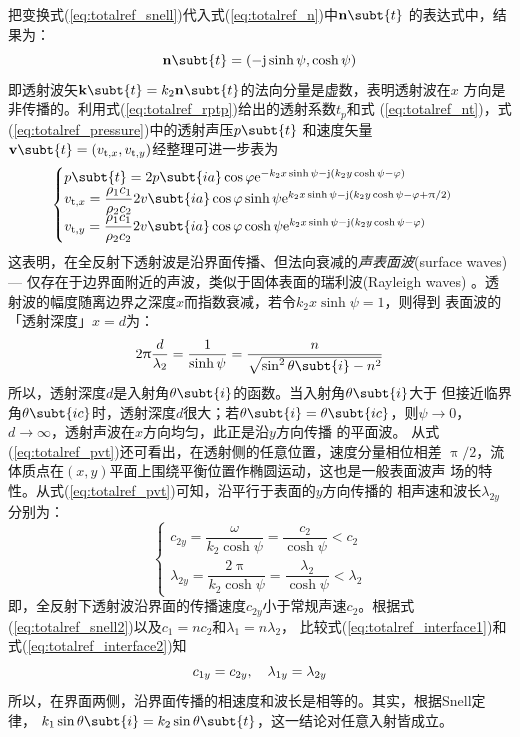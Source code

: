 \documentclass[UTF8]{ctexbook}
\begin{document}
把变换式(\ref{eq:totalref_snell})代入式(\ref{eq:totalref_n})中$\vb{n}\subt{t}$
的表达式中，结果为：
\begin{equation}
\vb{n}\subt{t} = (-\mj \sinh \psi, \cosh\psi)
\label{eq:totalref_nt}
\end{equation}
即透射波矢$\vb{k}\subt{t} = k_2\vb{n}\subt{t}$的法向分量是虚数，表明透射波在$x$
方向是非传播的。利用式(\ref{eq:totalref_rptp})给出的透射系数$t_p$和式
(\ref{eq:totalref_nt})，式(\ref{eq:totalref_pressure})中的透射声压$p\subt{t}$
和速度矢量$\vb{v}\subt{t}=(v_{\mathrm{t,} x}, v_{\mathrm{t,} y})$经整理可进一步表为
\begin{equation}
	\label{eq:totalref_pvt}
	\begin{cases}
		p\subt{t} = 2p\subt{ia} \cos \phi \me^{-k_2x\sinh \psi - \mj (k_2 y
		\cosh \psi -\phi)}\\
		v_{\mathrm{t,}x} = \dfrac{\rho_1c_1}{\rho_2c_2} 2v\subt{ia} \cos\phi
		\sinh \psi \me^{k_2x\sinh \psi - \mj\qty(k_2y\cosh \psi -\phi
		+\uppi/2)}\\
		v_{\mathrm{t,}y} = \dfrac{\rho_1c_1}{\rho_2c_2} 2v\subt{ia} \cos\phi
		\cosh \psi \me^{k_2x\sinh \psi - \mj\qty(k_2y\cosh \psi -\phi
		)}
	\end{cases}
\end{equation}
这表明，在全反射下透射波是沿界面传播、但法向衰减的\emph{声表面波}(surface
waves) --- 仅存在于边界面附近的声波，类似于固体表面的瑞利波(Rayleigh waves)
。透射波的幅度随离边界之深度$x$而指数衰减，若令$k_2x\sinh \psi = 1$，则得到
表面波的「透射深度」$x=d$为：
\begin{equation}
	2\uppi \frac{d}{\lambda_2} = \frac{1}{\sinh\psi} = \frac{n}{\sqrt{
		\sin^2\theta\subt{i}-n^2}}
\end{equation}
所以，透射深度$d$是入射角$\theta\subt{i}$的函数。当入射角$\theta\subt{i}$大于
但接近临界角$\theta\subt{ic}$时，透射深度$d$很大；若$\theta\subt{i}=\theta\subt{ic}
$，则$\psi\to0$，$d \to \infty$，透射声波在$x$方向均匀，此正是沿$y$方向传播
的平面波。
从式(\ref{eq:totalref_pvt})还可看出，在透射侧的任意位置，速度分量相位相差
$\uppi/2$，流体质点在$(x,y)$平面上围绕平衡位置作椭圆运动，这也是一般表面波声
场的特性。从式(\ref{eq:totalref_pvt})可知，沿平行于表面的$y$方向传播的
相声速和波长$\lambda_{2y}$分别为：
\begin{equation}
	\label{eq:totalref_interface2}
	\begin{cases}
		c_{2y} = \dfrac{\omega}{k_2\cosh\psi} = \dfrac{c_2}{\cosh\psi}<c_2\\
		\lambda_{2y} = \dfrac{2\uppi}{k_2\cosh \psi} = \dfrac{
		\lambda_2}{\cosh \psi} <\lambda_2
	\end{cases}
\end{equation}
即，全反射下透射波沿界面的传播速度$c_{2y}$小于常规声速$c_2$。根据式
(\ref{eq:totalref_snell2})以及$c_1=nc_2$和$\lambda_1 = n\lambda_2$，
比较式(\ref{eq:totalref_interface1})和式(\ref{eq:totalref_interface2})知
$$
c_{1y} = c_{2y} \qc \lambda_{1y}=\lambda_{2y}
$$
所以，在界面两侧，沿界面传播的相速度和波长是相等的。其实，根据Snell定律，
$k_1\sin\theta\subt{i} = k_2\sin\theta\subt{t}$，这一结论对任意入射皆成立。
 
\end{document}
